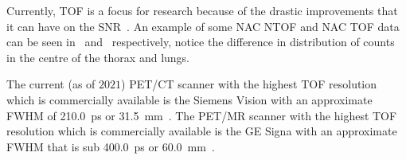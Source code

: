                 Currently, \gls{TOF} is a focus for research because of the drastic improvements that it can have on the \gls{SNR}~\parencite{Lecoq2017, Cates2018}. %
                An example of some \gls{NAC} \gls{NTOF} and \gls{NAC} \gls{TOF} data can be seen in~ and~ respectively, notice the difference in distribution of counts in the centre of the thorax and lungs.
                
                The current (as of $2021$) \gls{PET}/\gls{CT} scanner with the highest \gls{TOF} resolution which is commercially available is the Siemens Vision with an approximate \gls{FWHM} of \SI{210.0}{\pico\second} or \SI{31.5}{\milli\metre}~\parencite{VanSluis2019}. The \gls{PET}/\gls{MR} scanner with the highest \gls{TOF} resolution which is commercially available is the \gls{GE} Signa with an approximate \gls{FWHM} that is sub \SI{400.0}{\pico\second} or \SI{60.0}{\milli\metre}~\parencite{SIGNA, Hsu2017StudiesSystem, Caribe2019NEMAIsotopes}. %
            
